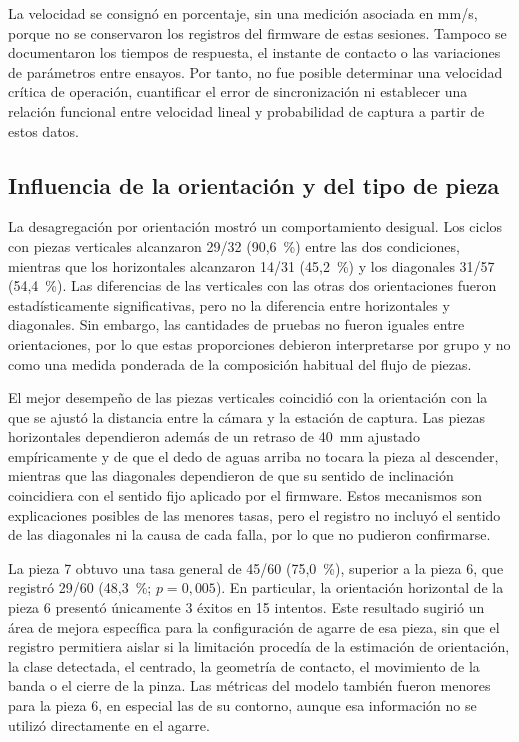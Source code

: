 La velocidad se consignó en porcentaje, sin una medición asociada en mm/s, porque no se conservaron los registros del firmware de estas sesiones. Tampoco se documentaron los tiempos de respuesta, el instante de contacto o las variaciones de parámetros entre ensayos. Por tanto, no fue posible determinar una velocidad crítica de operación, cuantificar el error de sincronización ni establecer una relación funcional entre velocidad lineal y probabilidad de captura a partir de estos datos.

\subsection{Influencia de la orientación y del tipo de pieza}

La desagregación por orientación mostró un comportamiento desigual. Los ciclos con piezas verticales alcanzaron 29/32 (90,6~\%) entre las dos condiciones, mientras que los horizontales alcanzaron 14/31 (45,2~\%) y los diagonales 31/57 (54,4~\%). Las diferencias de las verticales con las otras dos orientaciones fueron estadísticamente significativas, pero no la diferencia entre horizontales y diagonales. Sin embargo, las cantidades de pruebas no fueron iguales entre orientaciones, por lo que estas proporciones debieron interpretarse por grupo y no como una medida ponderada de la composición habitual del flujo de piezas.

El mejor desempeño de las piezas verticales coincidió con la orientación con la que se ajustó la distancia entre la cámara y la estación de captura. Las piezas horizontales dependieron además de un retraso de 40~mm ajustado empíricamente y de que el dedo de aguas arriba no tocara la pieza al descender, mientras que las diagonales dependieron de que su sentido de inclinación coincidiera con el sentido fijo aplicado por el firmware. Estos mecanismos son explicaciones posibles de las menores tasas, pero el registro no incluyó el sentido de las diagonales ni la causa de cada falla, por lo que no pudieron confirmarse.

La pieza 7 obtuvo una tasa general de 45/60 (75,0~\%), superior a la pieza 6, que registró 29/60 (48,3~\%; $p=0{,}005$). En particular, la orientación horizontal de la pieza 6 presentó únicamente 3 éxitos en 15 intentos. Este resultado sugirió un área de mejora específica para la configuración de agarre de esa pieza, sin que el registro permitiera aislar si la limitación procedía de la estimación de orientación, la clase detectada, el centrado, la geometría de contacto, el movimiento de la banda o el cierre de la pinza. Las métricas del modelo también fueron menores para la pieza 6, en especial las de su contorno, aunque esa información no se utilizó directamente en el agarre.

